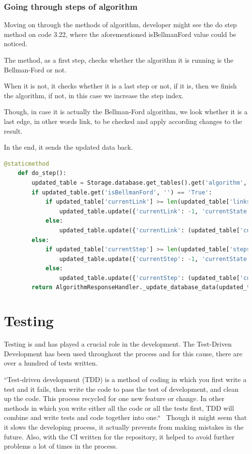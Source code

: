 \subsubsection{Going through steps of algorithm}

Moving on through the methods of algorithm, developer might see the do step method on code 3.22, where the aforementioned isBellmanFord value could be noticed.

The method, as a first step, checks whether the algorithm it is running is the Bellman-Ford or not.

When it is not, it checks whether it is a last step or not, if it is, then we finish the algorithm, if not, in this case we increase the step index.

Though, in case it is actually the Bellman-Ford algorithm, we look whether it is a last edge, in other words link, to be checked and apply according changes to the result.

In the end, it sends the updated data back.

\begin{lstlisting}[language={python}]
    @staticmethod
	def do_step():
		updated_table = Storage.database.get_tables().get('algorithm', {})
		if updated_table.get('isBellmanFord', '') == 'True':
			if updated_table['currentLink'] >= len(updated_table['links']) - 1 or updated_table['currentLink'] == -1:
				updated_table.update({'currentLink': -1, 'currentState': FINISHED_STATE})
			else:
				updated_table.update({'currentLink': (updated_table['currentLink'] + 1)})
		else:
			if updated_table['currentStep'] >= len(updated_table['steps']) - 1:
				updated_table.update({'currentStep': -1, 'currentState': FINISHED_STATE})
			else:
				updated_table.update({'currentStep': (updated_table['currentStep'] + 1)})
		return AlgorithmResponseHandler._update_database_data(updated_table)
\end{lstlisting}

\section{Testing}

Testing is and has played a crucial role in the development. The Test-Driven Development has been used throughout the process and for this cause, there are over a hundred of tests written.

``Test-driven development (TDD) is a method of coding in which you first write a test and it fails, then write the code to pass the test of development, and clean up the code. This process recycled for one new feature or change. In other methods in which you write either all the code or all the tests first, TDD will combine and write tests and code together into one.``~\cite{geeksforgeeks-tdd-def} Though it might seem that it slows the developing process, it actually prevents from making mistakes in the future. Also, with the CI written for the repository, it helped to avoid further problems a lot of times in the process.

